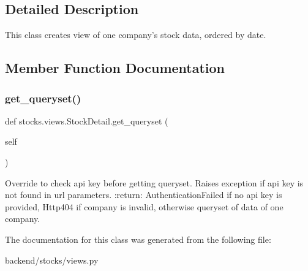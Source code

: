 \subsection{Detailed Description}
\begin{DoxyVerb}This class creates view of one company's stock data, ordered by date.
\end{DoxyVerb}
 

\subsection{Member Function Documentation}
\mbox{\label{classstocks_1_1views_1_1_stock_detail_a0fbaf7ab1f9964d060dce21b915c9aab}} 
\subsubsection{\texorpdfstring{get\+\_\+queryset()}{get\_queryset()}}
{\footnotesize\ttfamily def stocks.\+views.\+Stock\+Detail.\+get\+\_\+queryset (\begin{DoxyParamCaption}\item[{}]{self }\end{DoxyParamCaption})}

\begin{DoxyVerb}Override to check api key before getting queryset. Raises exception
if api key is not found in url parameters.
:return: AuthenticationFailed if no api key is provided,
 Http404 if company is invalid,
 otherwise queryset of data of one company.
\end{DoxyVerb}
 

The documentation for this class was generated from the following file\+:\begin{DoxyCompactItemize}
\item 
backend/stocks/views.\+py\end{DoxyCompactItemize}
